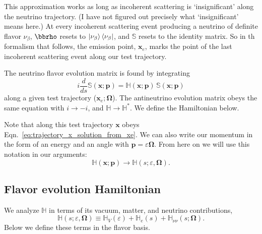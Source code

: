 \documentclass[aps,prd,twocolumn,superscriptaddress,groupedaddress]{revtex4}
\begin{document}
This approximation works as long as incoherent scattering is
`insignificant' along the neutrino trajectory.
(I have not figured out precisely what `insignificant' means here.)
At every incoherent scattering
event producing a neutrino of definite flavor $\nu_\beta$,
$\bbrho$ resets to $\ket{\nu_\beta}\bra{\nu_\beta}$, and
$\mathbb{S}$ resets to the identity matrix.
So in th formalism that follows,
the emission point, $\bm{x}_e$, marks the point of the
last incoherent scattering event along our test trajectory.

The neutrino flavor evolution matrix is found by integrating
\begin{equation}
  \label{eq:S_evolution}
  i\frac{d}{ds} \mathbb{S}(\bm{x};\bm{p}) =
  \mathbb{H}(\bm{x};\bm{p})\,
  \mathbb{S}(\bm{x};\bm{p})
\end{equation}
along a given test trajectory ($\bm{x}_e;\bm{\Omega}$).
The antineutrino evolution matrix obeys the same equation with
$i\rightarrow-i$, and $\mathbb{H}\rightarrow\mathbb{H}^*$.
We define the Hamiltonian below.

Note that along this test trajectory $\bm{x}$ obeys 
Eqn.~\ref{eq:trajectory_x_solution_from_xe}.
We can also write our momentum in the form of an energy and an angle
with $\bm{p}=\varepsilon\bm{\Omega}$.
From here on we will use this notation in our arguments:
\begin{equation}
  \mathbb{H}(\bm{x};\bm{p}) \rightarrow
  \mathbb{H}(s;\varepsilon,\bm{\Omega}). \nonumber
\end{equation}

\subsection*{Flavor evolution Hamiltonian}
We analyze $\mathbb{H}$ in terms of its vacuum, matter, and neutrino
contributions,
\begin{equation}
  \mathbb{H}(s;\varepsilon,\bm{\Omega}) \equiv
  \mathbb{H}_V(\varepsilon) +
  \mathbb{H}_e(s) +
  \mathbb{H}_{\nu\nu}(s;\bm{\Omega}).
\end{equation}
Below we define these terms in the flavor basis.
\end{document}
